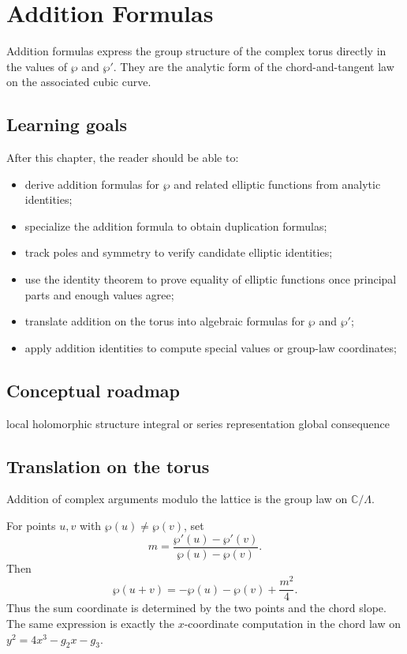 \chapter{Addition Formulas}
\label{ch:iv30}

Addition formulas express the group structure of the complex torus directly in the values of $\wp$ and $\wp'$. They are the analytic form of the chord-and-tangent law on the associated cubic curve.

\section*{Learning goals}
After this chapter, the reader should be able to:
\begin{itemize}
\item derive addition formulas for \(\wp\) and related elliptic functions from analytic identities;
\item specialize the addition formula to obtain duplication formulas;
\item track poles and symmetry to verify candidate elliptic identities;
\item use the identity theorem to prove equality of elliptic functions once principal parts and enough values agree;
\item translate addition on the torus into algebraic formulas for \(\wp\) and \(\wp'\);
\item apply addition identities to compute special values or group-law coordinates;
\end{itemize}
\section*{Conceptual roadmap}
\volroadmap
  {local holomorphic structure}
  {integral or series representation}
  {global consequence}

\section{Translation on the torus}
Addition of complex arguments modulo the lattice is the group law on $\mathbb C/\Lambda$.

\begin{example}\label{ex:iv30-expand-01}
For points \(u,v\) with \(\wp(u)\ne\wp(v)\), set
\[
m=\frac{\wp'(u)-\wp'(v)}{\wp(u)-\wp(v)}.
\]
Then
\[
\wp(u+v)=-\wp(u)-\wp(v)+\frac{m^2}{4}.
\]
Thus the sum coordinate is determined by the two points and the chord slope. The same expression is exactly the \(x\)-coordinate computation in the chord law on \(y^2=4x^3-g_2x-g_3\).
\end{example}
